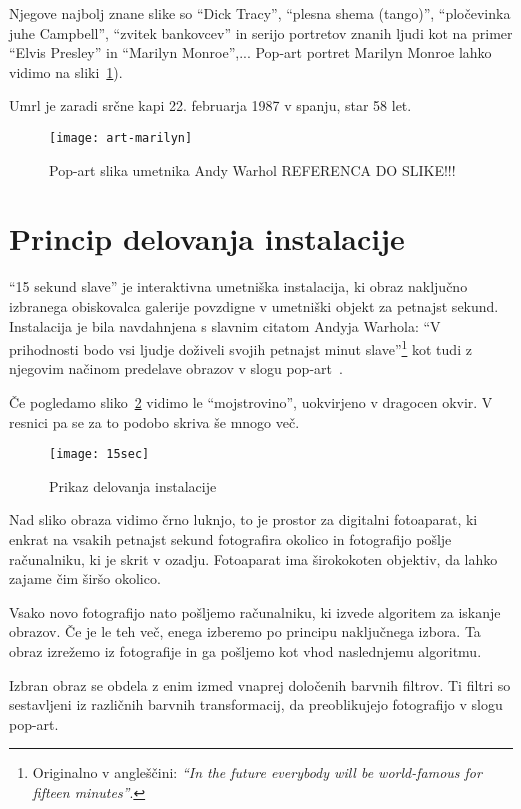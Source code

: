 Njegove najbolj znane slike so ``Dick Tracy'', ``plesna shema (tango)'',
``pločevinka juhe Campbell'', ``zvitek bankovcev'' in serijo portretov znanih
ljudi kot na primer ``Elvis Presley'' in ``Marilyn Monroe'',... Pop-art
portret Marilyn Monroe lahko vidimo na sliki~\ref{fig:art-marilyn}).

Umrl je zaradi srčne kapi 22. februarja 1987 v spanju, star 58 let.

\begin{figure}[!ht]
    \centering
    \texttt{[image: art-marilyn]}
    \caption{Pop-art slika umetnika Andy Warhol REFERENCA DO SLIKE!!!}
    \label{fig:art-marilyn}
\end{figure}

\section{Princip delovanja instalacije}
``15 sekund slave'' je interaktivna umetniška instalacija, ki obraz naključno
izbranega obiskovalca galerije povzdigne v umetniški objekt za petnajst
sekund. Instalacija je bila navdahnjena s slavnim citatom Andyja Warhola: ``V
prihodnosti bodo vsi ljudje doživeli svojih petnajst minut
slave''\footnote{Originalno v angleščini: \textit{``In the future everybody
will be world-famous for fifteen minutes''}\cite{andyExhibition}.} kot tudi z
njegovim načinom predelave obrazov v slogu pop-art~\cite{solina200215}.

Če pogledamo sliko~\ref{fig:15sec} vidimo le ``mojstrovino'', uokvirjeno v
dragocen okvir. V resnici pa se za to podobo skriva še mnogo več.

\begin{figure}
    \centering
    \texttt{[image: 15sec]}
    \caption{Prikaz delovanja instalacije}
    \label{fig:15sec}
\end{figure}

Nad sliko obraza vidimo črno luknjo, to je prostor za digitalni fotoaparat, ki
enkrat na vsakih petnajst sekund fotografira okolico in fotografijo pošlje
računalniku, ki je skrit v ozadju. Fotoaparat ima širokokoten objektiv, da
lahko zajame čim širšo okolico.

Vsako novo fotografijo nato pošljemo računalniku, ki izvede algoritem za
iskanje obrazov. Če je le teh več, enega izberemo po principu naključnega
izbora. Ta obraz izrežemo iz fotografije in ga pošljemo kot vhod
naslednjemu algoritmu.

Izbran obraz se obdela z enim izmed vnaprej določenih barvnih filtrov. Ti
filtri so sestavljeni iz različnih barvnih transformacij, da preoblikujejo
fotografijo v slogu pop-art. 


